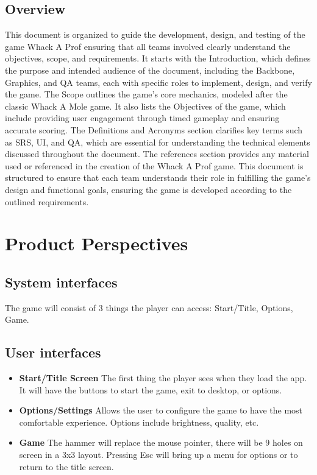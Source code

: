 \documentclass{article}
\begin{document}
\subsection{Overview}
This document is organized to guide the development, design, and testing of the game Whack A Prof ensuring that all teams involved clearly understand the objectives, scope, and requirements. It starts with the Introduction, which defines the purpose and intended audience of the document, including the Backbone, Graphics, and QA teams, each with specific roles to implement, design, and verify the game. The Scope outlines the game’s core mechanics, modeled after the classic Whack A Mole game. It also lists the Objectives of the game, which include providing user engagement through timed gameplay and ensuring accurate scoring. The Definitions and Acronyms section clarifies key terms such as SRS, UI, and QA, which are essential for understanding the technical elements discussed throughout the document. The references section provides any material used or referenced in the creation of the Whack A Prof game. This document is structured to ensure that each team understands their role in fulfilling the game’s design and functional goals, ensuring the game is developed according to the outlined requirements.

\newpage
\section{Product Perspectives}
\subsection{System interfaces}
The game will consist of 3 things the player can access: Start/Title, Options, Game.

\subsection{User interfaces}
\begin{itemize}
\item \textbf{Start/Title Screen} The first thing the player sees when they load the app. It will have the buttons to start the game, exit to desktop, or options.

\item \textbf{Options/Settings} Allows the user to configure the game to have the most comfortable experience. Options include brightness, quality, etc.

\item \textbf{Game} The hammer will replace the mouse pointer, there will be 9 holes on screen in a 3x3 layout. Pressing Esc will bring up a menu for options or to return to the title screen.

\end{itemize}
\end{document}

